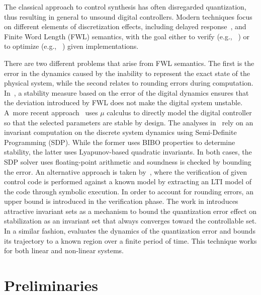 \documentclass[runningheads,a4paper]{llncs}
\newcommand{\addtodo}[1]{{\color{red} TODO: #1}}
\begin{document}
The classical approach to control synthesis has often disregarded
quantization, thus resulting in general to unsound digital controllers. 
Modern techniques focus on different elements of discretization effects,
including delayed response~\cite{Duggirala2015}, and Finite Word Length
(FWL) semantics, with the goal either to verify (e.g.,~ \cite{daes20161}) or
to optimize (e.g.,~ \cite{oudjida2014design}) given implementations.

There are two different problems that arise from FWL semantics.  The first
is the error in the dynamics caused by the inability to represent the exact
state of the physical system, while the second relates to rounding errors
during computation.  In~\cite{fialho1994stability}, a stability measure
based on the error of the digital dynamics ensures that the deviation
introduced by FWL does not make the digital system unstable.  A~more recent
approach~\cite{DBLP:journals/automatica/WuLCC09} uses $\mu$ calculus to
directly model the digital controller so that the selected parameters are
stable by design.  The analyses in~\cite{DBLP:conf/hybrid/RouxJG15,
DBLP:conf/hybrid/WangGRJF16} rely on an invariant computation on the
discrete system dynamics using Semi-Definite Programming (SDP).  While the
former uses BIBO properties to determine stability, the latter uses
Lyapunov-based quadratic invariants.  In both cases, the SDP solver uses
floating-point arithmetic and soundness is checked by bounding the error. 
An alternative approach is taken by~\cite{park2016scalable}, where the
verification of given control code is performed against a known model by
extracting an LTI model of the code through symbolic execution.  In order to
account for rounding errors, an upper bound is introduced in the
verification phase.  The work in \cite{picasso2003stabilization,
picasso2002construction} introduces attractive invariant sets as a mechanism
to bound the quantization error effect on stabilization as an invariant set
that always converges toward the controllable set.  In a similar fashion,
\cite{liberzon2003hybrid} evaluates the dynamics of the quantization error
and bounds its trajectory to a known region over a finite period of time. 
This technique works for both linear and non-linear systems.


\section{Preliminaries}
\label{sec:preliminaries}
\end{document}
